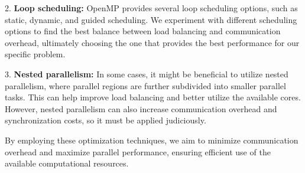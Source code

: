 \documentclass[12pt]{article}
\begin{document}
2. \textbf{Loop scheduling:} OpenMP provides several loop scheduling options, such as static, dynamic, and guided scheduling. We experiment with different scheduling options to find the best balance between load balancing and communication overhead, ultimately choosing the one that provides the best performance for our specific problem.

3. \textbf{Nested parallelism:} In some cases, it might be beneficial to utilize nested parallelism, where parallel regions are further subdivided into smaller parallel tasks. This can help improve load balancing and better utilize the available cores. However, nested parallelism can also increase communication overhead and synchronization costs, so it must be applied judiciously.

By employing these optimization techniques, we aim to minimize communication overhead and maximize parallel performance, ensuring efficient use of the available computational resources.
\end{document}
